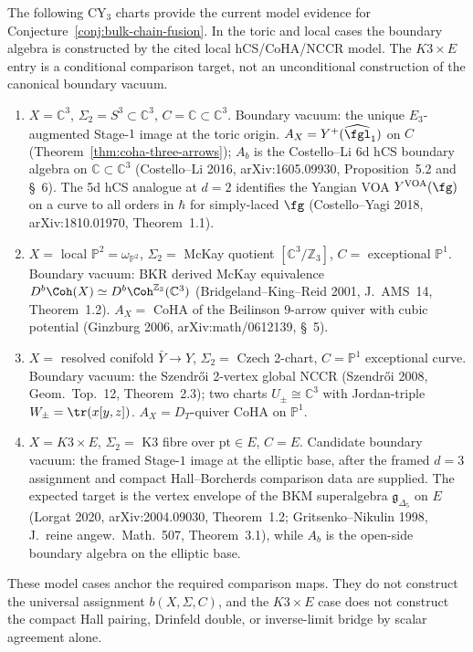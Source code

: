 \begin{proposition}
\label{thm:bulk-chain-fusion-verified}
The following CY$_3$ charts provide the current model evidence for
Conjecture~\ref{conj:bulk-chain-fusion}.  In the toric and local cases
the boundary algebra is constructed by the cited local hCS/CoHA/NCCR
model.  The \(K3\times E\) entry is a conditional comparison target, not
an unconditional construction of the canonical boundary vacuum.
\begin{enumerate}[label=\textup{(\roman*)}]
\item $X = \mathbb C^3$, $\Sigma_2 = S^3 \subset \mathbb C^3$,
$C = \mathbb C \subset \mathbb C^3$. Boundary vacuum: the unique
$E_3$-augmented Stage-$1$ image at the toric origin.
$A_X = Y^{+}(\widehat{\fgl}_1)$ on $C$
(Theorem~\ref{thm:coha-three-arrows}); $A_{b}$ is the Costello--Li
6d hCS boundary algebra on $\mathbb C \subset \mathbb C^3$
(Costello--Li 2016, arXiv:1605.09930, Proposition~5.2 and \S~6).
The 5d hCS analogue at $d = 2$ identifies the Yangian VOA
$Y^{\mathrm{VOA}}(\fg)$ on a curve to all orders in $\hbar$ for
simply-laced $\fg$ (Costello--Yagi 2018, arXiv:1810.01970,
Theorem~1.1).
\item $X = $ local $\mathbb P^2 = \omega_{\mathbb P^2}$,
$\Sigma_2 = $ McKay quotient $[\mathbb C^3 / \mathbb Z_3]$,
$C = $ exceptional $\mathbb P^1$. Boundary vacuum: BKR derived
McKay equivalence $D^b\Coh(X) \simeq D^b\Coh^{\mathbb Z_3}(\mathbb C^3)$
(Bridgeland--King--Reid 2001, J.\ AMS~14, Theorem~1.2). $A_X = $
CoHA of the Beilinson 9-arrow quiver with cubic potential
(Ginzburg 2006, arXiv:math/0612139, \S~5).
\item $X = $ resolved conifold $\bar Y \to Y$,
$\Sigma_2 = $ Czech 2-chart, $C = \mathbb P^1$ exceptional curve.
Boundary vacuum: the Szendr\H{o}i 2-vertex global NCCR
(Szendr\H{o}i 2008, Geom.\ Top.~12, Theorem~2.3); two charts
$U_{\pm} \cong \mathbb C^3$ with Jordan-triple
$W_{\pm} = \tr(x [y, z])$. $A_X = D_T$-quiver CoHA on $\mathbb P^1$.
\item $X = K3 \times E$, $\Sigma_2 = $ K3 fibre over $\mathrm{pt} \in
E$, $C = E$. Candidate boundary vacuum: the framed Stage-$1$ image at
the elliptic base, after the framed \(d=3\) assignment and compact
Hall--Borcherds comparison data are supplied.  The expected target is the
vertex envelope of the BKM superalgebra $\mathfrak g_{\Delta_5}$ on $E$
(Lorgat 2020, arXiv:2004.09030, Theorem~1.2; Gritsenko--Nikulin
1998, J.\ reine angew.\ Math.\ 507, Theorem~3.1), while \(A_b\) is the
open-side boundary algebra on the elliptic base.
\end{enumerate}
These model cases anchor the required comparison maps.  They do not
construct the universal assignment \(b(X,\Sigma,C)\), and the
\(K3\times E\) case does not construct the compact Hall pairing,
Drinfeld double, or inverse-limit bridge by scalar agreement alone.
\end{proposition}

